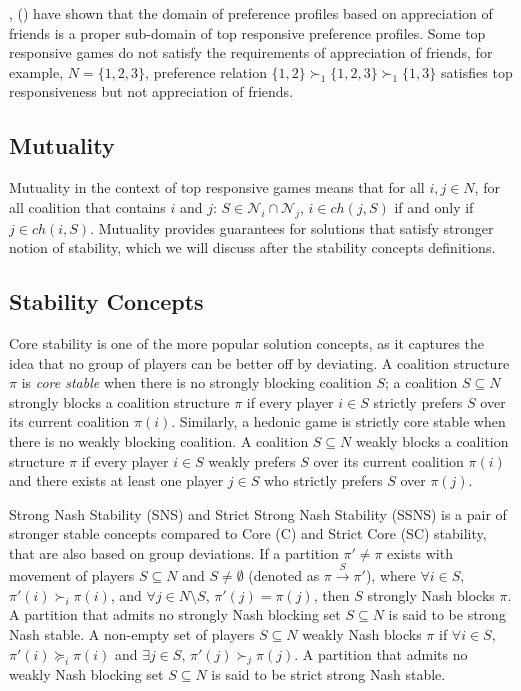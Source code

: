 \documentclass[letterpaper]{article} %
\newcommand{\citename}[1]{\citeauthor{#1}, (\citeyear{#1})}
\theoremstyle{definition}
\begin{document}
\citename{SuSu10} have shown that the domain of preference profiles based on appreciation of friends is a proper sub-domain of top responsive preference profiles. Some top responsive games do not satisfy the requirements of appreciation of friends, for example, $N = \{1, 2, 3\}$, preference relation $\{1, 2\} \succ_1 \{1, 2, 3\} \succ_1 \{1, 3\}$ satisfies top responsiveness but not appreciation of friends.

\subsection{Mutuality}
Mutuality in the context of top responsive games means that for all $i, j \in N$, for all coalition that contains $i$ and $j$: $S \in \mathcal{N}_i \cap \mathcal{N}_j$, $i \in ch(j, S)$ if and only if $j \in ch(i, S)$. Mutuality provides guarantees for solutions that satisfy stronger notion of stability, which we will discuss after the stability concepts definitions.

\subsection{Stability Concepts}
Core stability is one of the more popular solution concepts, as it captures the idea that no group of players can be better off by deviating. A coalition structure $\pi$ is {\it core stable} when there is no strongly blocking coalition $S$; a coalition $S \subseteq N$ strongly blocks a coalition structure $\pi$ if every player $i \in S$ strictly prefers $S$ over its current coalition $\pi(i)$. 
Similarly, a hedonic game is strictly core stable when there is no weakly blocking coalition. A coalition $S \subseteq N$ weakly blocks a coalition structure $\pi$ if every player $i \in S$ weakly prefers $S$ over its current coalition $\pi(i)$ and there exists at least one player $j \in S$ who strictly prefers $S$ over $\pi(j)$.

Strong Nash Stability (SNS) and Strict Strong Nash Stability (SSNS) is a pair of stronger stable concepts compared to Core (C) and Strict Core (SC) stability, that are also based on group deviations. If a partition $\pi' \neq \pi$ exists with movement of players $S \subseteq N$ and $S \neq \emptyset$ (denoted as $\pi \xrightarrow{S} \pi'$), where $\forall i \in S$, $\pi'(i) \succ_i \pi(i)$, and $\forall j \in N\text{\textbackslash}S$, $\pi'(j) = \pi(j)$, then $S$ strongly Nash blocks $\pi$. 
A partition that admits no strongly Nash blocking set $S \subseteq N$ is said to be strong Nash stable. A non-empty set of players $S \subseteq N$ weakly Nash blocks $\pi$ if $\forall i \in S$, $\pi'(i) \succeq_i \pi(i)$ and $\exists j \in S$, $\pi'(j) \succ_j \pi(j)$. 
A partition that admits no weakly Nash blocking set $S \subseteq N$ is said to be strict strong Nash stable.
\end{document}
